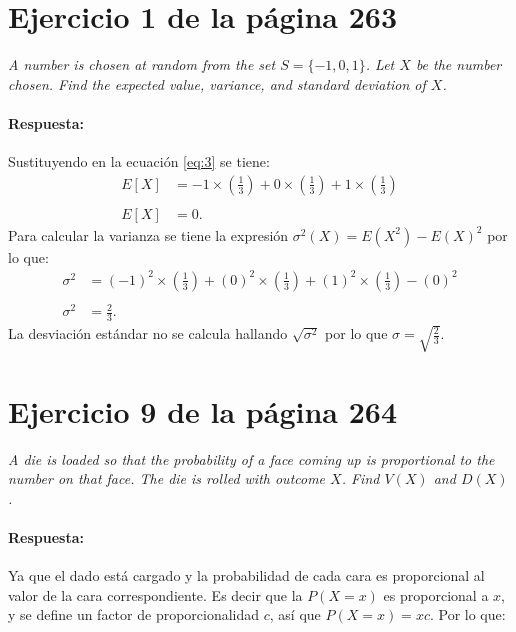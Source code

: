 \documentclass{article}
\begin{document}
\section{Ejercicio 1 de la página 263}   
 \emph{A number is chosen at random from the set \( S = \lbrace -1, 0, 1 \rbrace \). Let \(X\) be the number chosen. Find the expected value, variance, and standard deviation of \(X\).}
 
\paragraph{Respuesta:}Sustituyendo en la ecuación \ref{eq:3} se tiene:
\begin{equation}
\begin{array}{ll}
   E[X] &= -1\times \left(\frac{1}{3}\right) + 0\times \left(\frac{1}{3}\right)+1\times \left(\frac{1}{3}\right)\\
   &\\
   E[X] & = 0. 
     \end{array}
   \end{equation}
Para calcular la varianza se tiene la expresión $\sigma ^{2}(X)= E(X^{2})-E(X)^{2}$ por lo que:   
  \begin{equation}
\begin{array}{ll}
   \sigma ^{2} &= (-1)^{2}\times \left(\frac{1}{3}\right) + (0)^{2}\times \left(\frac{1}{3}\right)+(1)^{2}\times \left(\frac{1}{3}\right) -(0)^{2}\\
   &\\
   \sigma ^{2} & = \frac{2}{3}. 
   
     \end{array}
   \end{equation}
   La desviación estándar no se calcula hallando $\sqrt{\sigma ^{2}} $ por lo que $\sigma =\sqrt{\frac{2}{3}}$.
\section{Ejercicio 9 de la página 264}      
   \emph{A die is loaded so that the probability of a face coming up is proportional to the number on that face. The die is rolled with outcome $X$. Find $V(X)$ and $D(X)$.}
   
\paragraph{Respuesta:}  Ya que el dado está cargado y la probabilidad de cada cara es proporcional al valor de la cara correspondiente. Es decir que la $P(X=x)$ es proporcional a $x$, y se define un factor de proporcionalidad $c$, así que $P(X=x)=xc$. Por lo que:
\end{document}
